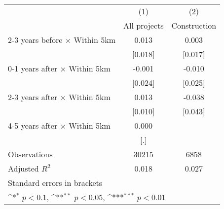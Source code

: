 {
\def\sym#1{\ifmmode^{#1}\else\(^{#1}\)\fi}
\begin{tabular}{l*{2}{c}}
\hline\hline
                    &\multicolumn{1}{c}{(1)}&\multicolumn{1}{c}{(2)}\\
                    &\multicolumn{1}{c}{All projects}&\multicolumn{1}{c}{Construction}\\
\hline
2-3 years before $\times$ Within 5km&       0.013         &       0.003         \\
                    &     [0.018]         &     [0.017]         \\
0-1 years after $\times$ Within 5km&      -0.001         &      -0.010         \\
                    &     [0.024]         &     [0.025]         \\
2-3 years after $\times$ Within 5km&       0.013         &      -0.038         \\
                    &     [0.010]         &     [0.043]         \\
4-5 years after $\times$ Within 5km&       0.000         &                     \\
                    &         [.]         &                     \\
\hline
Observations        &       30215         &        6858         \\
Adjusted \(R^{2}\)  &       0.018         &       0.027         \\
\hline\hline
\multicolumn{3}{l}{\footnotesize Standard errors in brackets}\\
\multicolumn{3}{l}{\footnotesize \sym{*} \(p<0.1\), \sym{**} \(p<0.05\), \sym{***} \(p<0.01\)}\\
\end{tabular}
}

